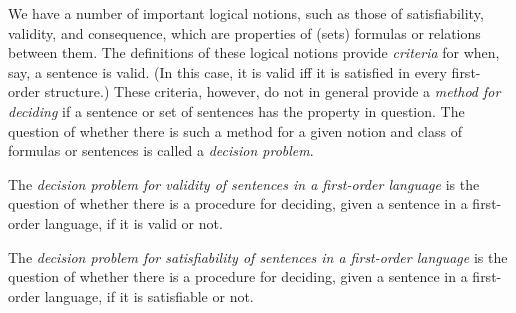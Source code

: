 \documentclass[../../include/open-logic-section]{subfiles}
\begin{document}

\begin{explain}
We have a number of important logical notions, such as those of
satisfiability, validity, and consequence, which are properties of
(sets) formulas or relations between them.  The definitions of these
logical notions provide \emph{criteria} for when, say, a sentence is
valid. (In this case, it is valid iff it is satisfied in every first-order
structure.)  These criteria, however, do not in general provide a
\emph{method for deciding} if a sentence or set of sentences has the
property in question.  The question of whether there is such a method
for a given notion and class of formulas or sentences is called a
\emph{decision problem}.
\end{explain}

\begin{ex}
The \emph{decision problem for validity of sentences in a first-order
  language} is the question of whether there is a procedure for
deciding, given a sentence in a first-order language, if it is valid
or not.
\end{ex}

\begin{ex}
The \emph{decision problem for satisfiability of sentences in a first-order
  language} is the question of whether there is a procedure for
deciding, given a sentence in a first-order language, if it is satisfiable
or not.
\end{ex}
\end{document}
